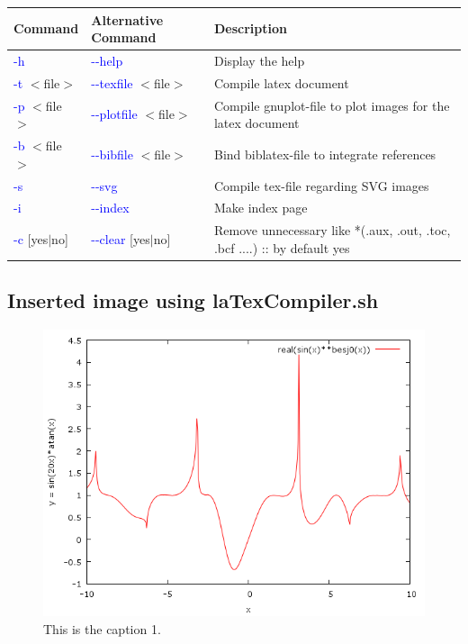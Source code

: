 \documentclass[11pt,a4paper,twoside]{article}
\begin{document}
	\hspace*{-1.3cm}\begin{tabular}{lll}
		\textbf{Command} & \textbf{Alternative Command} & \textbf{Description}\\
		\hline\hline	
		 \textcolor{blue}{-h}          	 & \textcolor{blue}{-{}-help}               		& Display the help\\ 
		 \hline
		 \textcolor{blue}{-t} $<$file$>$\footnotemark[1]   & \textcolor{blue}{-{}-texfile} $<$file$>$\footnotemark[1]    	& Compile latex document\\ 
		 \hline
		 \textcolor{blue}{-p} $<$file$>$\footnotemark[1]   & \textcolor{blue}{-{}-plotfile} $<$file$>$\footnotemark[1]     	& Compile gnuplot-file to plot images for the latex document\\ 
		 \hline
		 \textcolor{blue}{-b} $<$file$>$\footnotemark[1]   & \textcolor{blue}{-{}-bibfile} $<$file$>$\footnotemark[1]      	& Bind biblatex-file to integrate references\\ 
		 \hline
		 \textcolor{blue}{-s}          	 & \textcolor{blue}{-{}-svg}                		& Compile tex-file regarding SVG images\\ 
		 \hline
		 \textcolor{blue}{-i}          	 & \textcolor{blue}{-{}-index}               		& Make index page\\ 
		 \hline
		 \textcolor{blue}{-c} [yes$|$no] 	 & \textcolor{blue}{-{}-clear} [yes$|$no]      	& Remove unnecessary like *(.aux, .out, .toc, .bcf ....) :: by default yes\\ 
		 \hline
	\end{tabular}


	\subsection{Inserted image using laTexCompiler.sh}
		\begin{figure}[!h]
		   \centering
		 	\includegraphics[width=12cm]{nameOfTheImage.png}
		 	\caption{This is the caption 1.}
		\end{figure}
\end{document}
